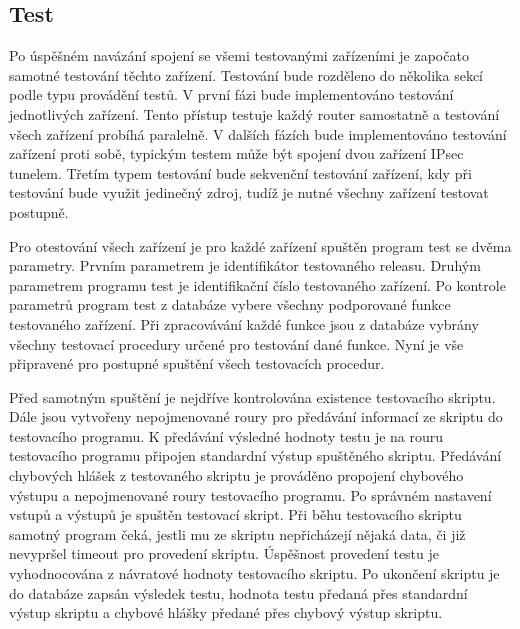 \subsection{Test}
Po úspěšném navázání spojení se všemi testovanými zařízeními je započato samotné testování těchto zařízení. Testování bude rozděleno do několika sekcí podle typu provádění testů. V první fázi bude implementováno testování jednotlivých zařízení. Tento přístup testuje každý router samostatně a testování všech zařízení probíhá paralelně. V dalších fázích bude implementováno testování zařízení proti sobě, typickým testem může být spojení dvou zařízení IPsec tunelem. Třetím typem testování bude sekvenční testování zařízení, kdy při testování bude využit jedinečný zdroj, tudíž je nutné všechny zařízení testovat postupně.

Pro otestování všech zařízení je pro každé zařízení spuštěn program test se dvěma parametry. Prvním parametrem je identifikátor testovaného releasu. Druhým parametrem programu test je identifikační číslo testovaného zařízení. Po kontrole parametrů program test z databáze vybere všechny podporované funkce testovaného zařízení. Při zpracovávání každé funkce jsou z databáze vybrány všechny testovací procedury určené pro testování dané funkce. Nyní je vše připravené pro postupné spuštění všech testovacích procedur.

Před samotným spuštění je nejdříve kontrolována existence testovacího skriptu. Dále jsou vytvořeny nepojmenované roury pro předávání informací ze skriptu do testovacího programu. K předávání výsledné hodnoty testu je na rouru testovacího programu připojen standardní výstup spuštěného skriptu. Předávání chybových hlášek z testovaného skriptu je prováděno propojení chybového výstupu a nepojmenované roury testovacího programu. Po správném nastavení vstupů a výstupů je spuštěn testovací skript. Při běhu testovacího skriptu samotný program čeká, jestli mu ze skriptu nepřicházejí nějaká data, či již nevypršel timeout pro provedení skriptu. Úspěšnost provedení testu je vyhodnocována z návratové hodnoty testovacího skriptu. Po ukončení skriptu je do databáze zapsán výsledek testu, hodnota testu předaná přes standardní výstup skriptu a chybové hlášky předané přes chybový výstup skriptu.

